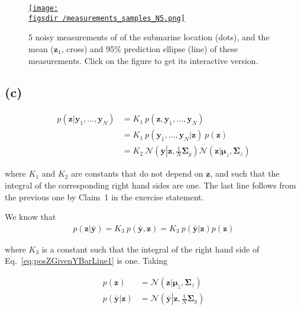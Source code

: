 \documentclass[12pt]{article}
\def\figsdir{../../../../../../code/scripts/probability/unsupervisedInferenceInTheLinearGaussianModel/figures/}
\def\figsURLdir{http://www.gatsby.ucl.ac.uk/~rapela/gcnuBridging2023/lectures/9_inference/inferenceInTheLinearGaussianModel/exercises/figures/}
\begin{document}
\begin{center}
    \begin{figure}[H]
        \href{\figsURLdir/measurements_samples_N5.html}{\texttt{[image: \\figsdir /measurements\_samples\_N5.png]}}

        \caption{5 noisy measurements of of the submarine location (dots), and
        the mean ($\mathbf{z}_1$, cross) and 95\% prediction ellipse (line) of
        these measurements. Click on the figure to get its interactive
        version.}

        \label{fig:b}
    \end{figure}
\end{center}

\subsection*{(c)} 

\begin{align}
    p(\mathbf{z}|\mathbf{y}_1,\ldots,\mathbf{y}_N)&=K_1\ p(\mathbf{z},\mathbf{y}_1,\ldots,\mathbf{y}_N)\nonumber\\
                                                  &=K_1\ p(\mathbf{y}_1,\ldots,\mathbf{y}_N|\mathbf{z})\ p(\mathbf{z})\nonumber\\
                                                  &=K_2\
                                                  \mathcal{N}\left(\bar{\mathbf{y}}\left|\mathbf{z},\frac{1}{N}\boldsymbol{\Sigma}_y\right.\right)\mathcal{N}\left(\mathbf{z}|\boldsymbol{\mu}_z,\boldsymbol{\Sigma}_z\right)\label{eq:posZLine3}
\end{align}

\noindent where $K_1$ and $K_2$ are constants that do not depend on
$\mathbf{z}$, and such that the integral of the corresponding right hand sides
are one. The last line follows from the previous one by Claim~1 in the exercise
statement.

We know that
\begin{align}
    p(\mathbf{z}|\bar{\mathbf{y}})=K_3\ p(\bar{\mathbf{y}},\mathbf{z})=K_3\ p(\bar{\mathbf{y}}|\mathbf{z})p(\mathbf{z})\label{eq:posZGivenYBarLine1}
\end{align}

\noindent where $K_3$ is a constant such that the integral of the right hand
side of Eq.~\ref{eq:posZGivenYBarLine1} is one. Taking

\begin{align}
    p(\mathbf{z})&=\mathcal{N}\left(\mathbf{z}|\boldsymbol{\mu}_z,\boldsymbol{\Sigma}_z\right)\label{eq:priorZ}\\
    p(\bar{\mathbf{y}}|\mathbf{z})&=\mathcal{N}\left(\bar{\mathbf{y}}\left|\mathbf{z},\frac{1}{N}\boldsymbol{\Sigma}_y\right.\right)\label{eq:posYBarGivenZ}
\end{align}
\end{document}
